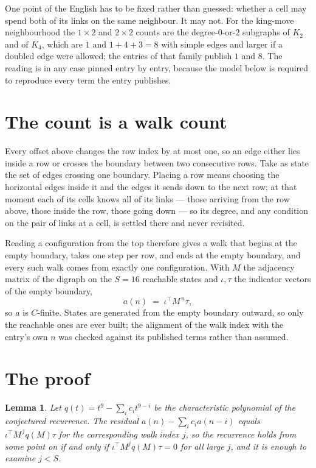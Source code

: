 \documentclass[11pt,a4paper]{article}
\theoremstyle{plain}
\newtheorem{lemma}[theorem]{Lemma}
\theoremstyle{definition}
\begin{document}
One point of the English has to be fixed rather than guessed: whether a cell may spend both of
its links on the same neighbour. It may not. For the king-move neighbourhood the $1\times2$
and $2\times2$ counts are the degree-$0$-or-$2$ subgraphs of $K_2$ and of $K_4$, which are $1$
and $1+4+3=8$ with simple edges and larger if a doubled edge were allowed; the entries of that
family publish $1$ and $8$. The reading is in any case pinned entry by entry, because the
model below is required to reproduce every term the entry publishes.


\section{The count is a walk count}

Every offset above changes the row index by at most one, so an edge either lies inside a row
or crosses the boundary between two consecutive rows. Take as state the set of edges crossing
one boundary. Placing a row means choosing the horizontal edges inside it and the edges it
sends down to the next row; at that moment each of its cells knows all of its links --- those
arriving from the row above, those inside the row, those going down --- so its degree, and any
condition on the pair of links at a cell, is settled there and never revisited.

Reading a configuration from the top therefore gives a walk that begins at the empty boundary,
takes one step per row, and ends at the empty boundary, and every such walk comes from exactly
one configuration. With $M$ the adjacency matrix of the digraph on the $S=16$ reachable
states and $\iota,\tau$ the indicator vectors of the empty boundary,
\[
a(n)\;=\;\iota^{\!\top}M^{\,n}\tau ,
\]
so $a$ is $C$-finite. States are generated from the empty boundary outward, so only the
reachable ones are ever built; the alignment of the walk index with the entry's own $n$ was
checked against its published terms rather than assumed.

\section{The proof}

\begin{lemma}\label{lem:crit}
Let $q(t)=t^{9}-\sum_i c_it^{9-i}$ be the characteristic polynomial of the
conjectured recurrence. The residual $a(n)-\sum_ic_ia(n-i)$ equals
$\iota^{\!\top}M^{\,j}q(M)\tau$ for the corresponding walk index $j$, so the recurrence
holds from some point on if and only if $\iota^{\!\top}M^{j}q(M)\tau=0$ for all large $j$,
and it is enough to examine $j<S$.
\end{lemma}
\end{document}
